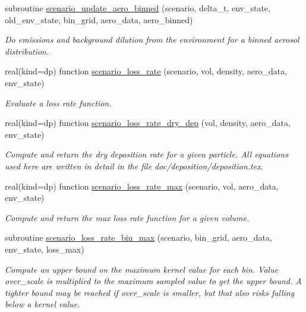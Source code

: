 \begin{DoxyCompactItemize}
subroutine \mbox{\hyperlink{namespacepmc__scenario_aa8ca6c77c94665bdbf4c4f25e2dd1523}{scenario\+\_\+update\+\_\+aero\+\_\+binned}} (scenario, delta\+\_\+t, env\+\_\+state, old\+\_\+env\+\_\+state, bin\+\_\+grid, aero\+\_\+data, aero\+\_\+binned)
\begin{DoxyCompactList}\small\item\em Do emissions and background dilution from the environment for a binned aerosol distribution. \end{DoxyCompactList}\item 
real(kind=dp) function \mbox{\hyperlink{namespacepmc__scenario_ab60e2eeb66ae8849ad11923d76a9bd7f}{scenario\+\_\+loss\+\_\+rate}} (scenario, vol, density, aero\+\_\+data, env\+\_\+state)
\begin{DoxyCompactList}\small\item\em Evaluate a loss rate function. \end{DoxyCompactList}\item 
real(kind=dp) function \mbox{\hyperlink{namespacepmc__scenario_adbc0c60c8638d7bc02416577dedf89ac}{scenario\+\_\+loss\+\_\+rate\+\_\+dry\+\_\+dep}} (vol, density, aero\+\_\+data, env\+\_\+state)
\begin{DoxyCompactList}\small\item\em Compute and return the dry deposition rate for a given particle. All equations used here are written in detail in the file {\ttfamily doc/deposition/deposition.\+tex}. \end{DoxyCompactList}\item 
real(kind=dp) function \mbox{\hyperlink{namespacepmc__scenario_a3b3b510051adbe1f82741b50ea7d5857}{scenario\+\_\+loss\+\_\+rate\+\_\+max}} (scenario, vol, aero\+\_\+data, env\+\_\+state)
\begin{DoxyCompactList}\small\item\em Compute and return the max loss rate function for a given volume. \end{DoxyCompactList}\item 
subroutine \mbox{\hyperlink{namespacepmc__scenario_a5b6292cb3c74aba853700581ea964bc0}{scenario\+\_\+loss\+\_\+rate\+\_\+bin\+\_\+max}} (scenario, bin\+\_\+grid, aero\+\_\+data, env\+\_\+state, loss\+\_\+max)
\begin{DoxyCompactList}\small\item\em Compute an upper bound on the maximum kernel value for each bin. Value over\+\_\+scale is multiplied to the maximum sampled value to get the upper bound. A tighter bound may be reached if over\+\_\+scale is smaller, but that also risks falling below a kernel value. \end{DoxyCompactList}\item 

\end{DoxyCompactItemize}
